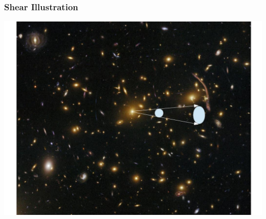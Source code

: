 \documentclass{beamer}
\begin{document}
\frame
{
    \frametitle{Shear Illustration}
    \includegraphics[width=\textwidth]{shear-illustration.jpg}
}
\end{document}
